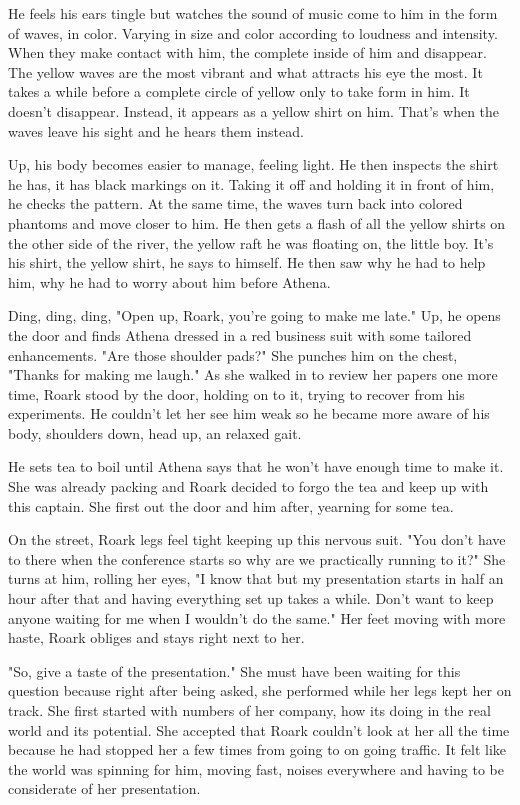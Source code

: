         He feels his ears tingle but watches the sound of music come to him in the form of waves, in color. Varying in size and color according
    to loudness and intensity. When they make contact with him, the complete inside of him and disappear. The yellow waves are the most vibrant
    and what attracts his eye the most. It takes a while before a complete circle of yellow only to take form in him. It doesn't disappear. 
    Instead, it appears as a yellow shirt on him. That's when the waves leave his sight and he hears them instead.

        Up, his body becomes easier to manage, feeling light. He then inspects the shirt he has, it has black markings on it. Taking it off and
    holding it in front of him, he checks the pattern. At the same time, the waves turn back into colored phantoms and move closer to him.
    He then gets a flash of all the yellow shirts on the other side of the river, the yellow raft he was floating on, the little boy. It's his
    shirt, the yellow shirt, he says to himself. He then saw why he had to help him, why he had to worry about him before Athena.

        Ding, ding, ding, "Open up, Roark, you're going to make me late." Up, he opens the door and finds Athena dressed in a red business suit
    with some tailored enhancements. "Are those shoulder pads?" She punches him on the chest, "Thanks for making me laugh." As she walked in to
    review her papers one more time, Roark stood by the door, holding on to it, trying to recover from his experiments. He couldn't let her 
    see him weak so he became more aware of his body, shoulders down, head up, an relaxed gait.

        He sets tea to boil until Athena says that he won't have enough time to make it. She was already packing and Roark decided to forgo the
    tea and keep up with this captain. She first out the door and him after, yearning for some tea.

        On the street, Roark legs feel tight keeping up this nervous suit. "You don't have to there when the conference starts so why are we
    practically running to it?" She turns at him, rolling her eyes, "I know that but my presentation starts in half an hour after that and 
    having everything set up takes a while. Don't want to keep anyone waiting for me when I wouldn't do the same." Her feet moving with more
    haste, Roark obliges and stays right next to her.

        "So, give a taste of the presentation." She must have been waiting for this question because right after being asked, she performed while
    her legs kept her on track. She first started with numbers of her company, how its doing in the real world and its potential. She accepted
    that Roark couldn't look at her all the time because he had stopped her a few times from going to on going traffic. It felt like the world
    was spinning for him, moving fast, noises everywhere and having to be considerate of her presentation.

